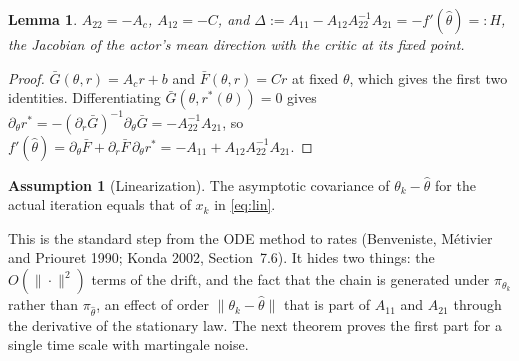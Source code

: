 \documentclass[11pt]{article}
\newtheorem{lemma}[theorem]{Lemma}
\theoremstyle{definition}
\newtheorem{assumption}[theorem]{Assumption}
\theoremstyle{remark}
\begin{document}
\begin{lemma}\label{lem:delta}
$A_{22} = -A_c$, $A_{12} = -C$, and
$\Delta := A_{11} - A_{12}A_{22}^{-1}A_{21} = -f'(\hat\theta) =: H$, the Jacobian of the actor's mean
direction with the critic at its fixed point.
\end{lemma}
\begin{proof}
$\bar G(\theta, r) = A_cr + b$ and $\bar F(\theta, r) = Cr$ at fixed $\theta$, which gives the first two
identities. Differentiating $\bar G(\theta, r^*(\theta)) = 0$ gives
$\partial_\theta r^* = -(\partial_r\bar G)^{-1}\partial_\theta\bar G = -A_{22}^{-1}A_{21}$, so
$f'(\hat\theta) = \partial_\theta\bar F + \partial_r\bar F\,\partial_\theta r^* = -A_{11} + A_{12}A_{22}^{-1}A_{21}$.
\end{proof}

\begin{assumption}[Linearization]\label{ass:lin}
The asymptotic covariance of $\theta_k - \hat\theta$ for the actual iteration equals that of $x_k$ in
\eqref{eq:lin}.
\end{assumption}

This is the standard step from the ODE method to rates (Benveniste, M\'etivier and Priouret
1990; Konda 2002, Section~7.6). It hides two things: the $O(\|\cdot\|^2)$ terms of the drift, and the
fact that the chain is generated under $\pi_{\theta_k}$ rather than $\pi_{\hat\theta}$, an effect of order
$\|\theta_k - \hat\theta\|$ that is part of $A_{11}$ and $A_{21}$ through the derivative of the stationary law.
The next theorem proves the first part for a single time scale with martingale noise.
\end{document}
